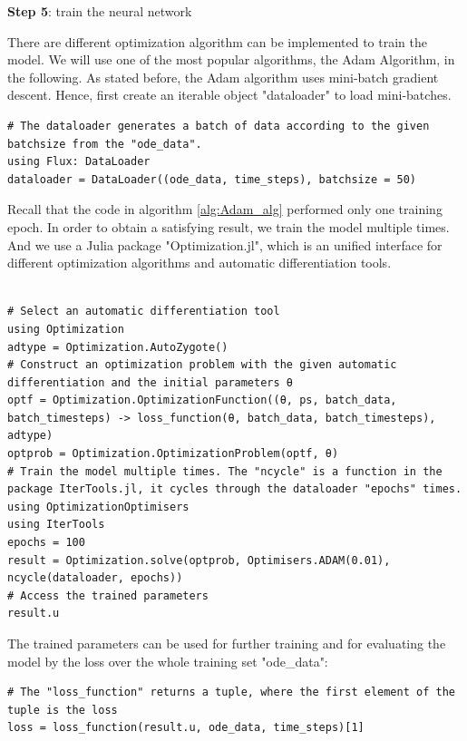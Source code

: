 \documentclass[
	parskip, 			   %
	twoside, 			   %
	DIV=14, 			   %
	BCOR=15.0mm, 		   %
	headsepline, 		   %
	open=right, 		   %
	captions=tableheading, %
	bibliography=totoc,    %
	numbers=noenddot       %
]{scrreprt}
\begin{document}
\textbf{Step 5}: train the neural network

There are different optimization algorithm can be implemented to train the model. We will use one of the most popular algorithms, the Adam Algorithm, in the following. As stated before, the Adam algorithm uses mini-batch gradient descent. Hence, first create an iterable object "dataloader" to load mini-batches.

\begin{verbatim}
# The dataloader generates a batch of data according to the given batchsize from the "ode_data".
using Flux: DataLoader
dataloader = DataLoader((ode_data, time_steps), batchsize = 50)
\end{verbatim}

Recall that the code in algorithm \ref{alg:Adam_alg} performed only one training epoch. In order to obtain a satisfying result, we train the model multiple times. And we use a Julia package "Optimization.jl", which is an unified interface for different optimization algorithms and automatic differentiation tools.

\begin{verbatim}

# Select an automatic differentiation tool
using Optimization
adtype = Optimization.AutoZygote()
# Construct an optimization problem with the given automatic differentiation and the initial parameters θ
optf = Optimization.OptimizationFunction((θ, ps, batch_data, batch_timesteps) -> loss_function(θ, batch_data, batch_timesteps), adtype)
optprob = Optimization.OptimizationProblem(optf, θ)
# Train the model multiple times. The "ncycle" is a function in the package IterTools.jl, it cycles through the dataloader "epochs" times.
using OptimizationOptimisers
using IterTools
epochs = 100
result = Optimization.solve(optprob, Optimisers.ADAM(0.01), ncycle(dataloader, epochs))
# Access the trained parameters
result.u
\end{verbatim}

The trained parameters can be used for further training and for evaluating the model by the loss over the whole training set "ode\_data":
\begin{verbatim}
# The "loss_function" returns a tuple, where the first element of the tuple is the loss
loss = loss_function(result.u, ode_data, time_steps)[1]
\end{verbatim}
\end{document}
